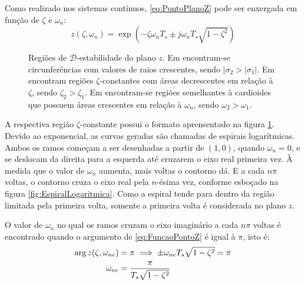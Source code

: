 Como realizado nos sistemas contínuos, \eqref{eq:PontoPlanoZ} pode ser enxergada em função de $\zeta$ e $\omega_n$:
\begin{equation}
  z(\zeta,\omega_n) = \exp{\left(-\zeta\omega_nT_s \pm j\omega_nT_s\sqrt{1-\zeta^2}\right)}\label{eq:FuncaoPontoZ}
\end{equation}
\begin{figure}[!ht]
  \centering
  \begin{subfigure}[t]{0.3\columnwidth}
      
      \caption{}
      \label{subfig:EstabilidadeRelativaZ}
  \end{subfigure}
  \begin{subfigure}[t]{0.3\columnwidth}
      
      \caption{}
      \label{subfig:TaxaDeAmortecimentoZ}
  \end{subfigure}
  \begin{subfigure}[t]{0.3\columnwidth}
    
    \caption{}
    \label{subfig:OscilacaoNaoAmortecidaZ}
  \end{subfigure}
  \caption{Regiões de $\mathscr{D}$-estabilidade do plano $z$. Em  encontram-se circunferências com valores de raios crescentes, sendo $|\sigma_2 > |\sigma_1|$. Em  encontram regiões $\zeta$-constantes com áreas decrescentes em relação à $\zeta$, sendo $\zeta_2 > \zeta_1$. Em  encontram-se regiões semelhantes à cardioides que possuem áreas crescentes em relação à $\omega_n$, sendo $\omega_2 > \omega_1$.}
  \label{fig:RegioesPlanoZ}
\end{figure}

A respectiva região $\zeta$-constante possui o formato aprensentado na figura \ref{subfig:EstabilidadeRelativaZ}. Devido ao exponencial, as curvas geradas são chamadas de espirais logarítmicas. Ambos os ramos começam a ser desenhadas a partir de $(1,0)$, quando $\omega_n = 0$, e se deslocam da direita para a esquerda até cruzarem o eixo real primeira vez. À medida que o valor de $\omega_n$ aumenta, mais voltas o contorno dá. E a cada $n\pi$ voltas, o contorno cruza o eixo real pela $n$-ésima vez, conforme esboçado na figura \ref{fig:EspiralLogaritmica}. Como a espiral tende para dentro da região limitada pela primeira volta, somente a primeira volta é considerada no plano $z$.


O valor de $\omega_n$ no qual os ramos cruzam o eixo imaginário a cada $n\pi$ voltas é encontrado quando o argumento de \eqref{eq:FuncaoPontoZ} é igual à $\pi$, isto é:
\begin{align}
  \arg{z(\zeta,\omega_{ne})} &= \pi \implies \pm \omega_{ne}T_s\sqrt{1-\zeta^2} = \pi\notag\\
  \omega_{ne} &= \dfrac{\pi}{T_s\sqrt{1-\zeta^2}}\label{eq:PontoExtremoZetaZ}
\end{align}


